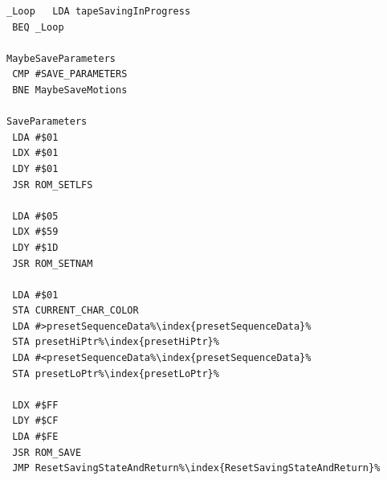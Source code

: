 \begin{minipage}[b]{0.33\linewidth}
\begin{lrbox}{\mybox}
\begin{lstlisting}[basicstyle=\ttfamily\tiny,escapechar=\%]
_Loop   LDA tapeSavingInProgress
 BEQ _Loop

MaybeSaveParameters
 CMP #SAVE_PARAMETERS
 BNE MaybeSaveMotions

SaveParameters
 LDA #$01
 LDX #$01
 LDY #$01
 JSR ROM_SETLFS

 LDA #$05
 LDX #$59
 LDY #$1D
 JSR ROM_SETNAM

 LDA #$01
 STA CURRENT_CHAR_COLOR
 LDA #>presetSequenceData%\index{presetSequenceData}%
 STA presetHiPtr%\index{presetHiPtr}%
 LDA #<presetSequenceData%\index{presetSequenceData}%
 STA presetLoPtr%\index{presetLoPtr}%

 LDX #$FF
 LDY #$CF
 LDA #$FE
 JSR ROM_SAVE
 JMP ResetSavingStateAndReturn%\index{ResetSavingStateAndReturn}%

\end{lstlisting}
\end{lrbox}%
\scalebox{0.8}{\usebox{\mybox}}
\end{minipage}
\hspace{-0.1cm}
